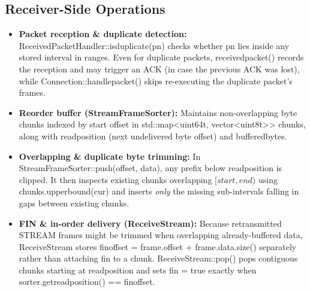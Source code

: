 \documentclass[10pt,a4paper]{article}
\newcommand{\codeul}{\textunderscore\hspace{0pt}}
\DeclareRobustCommand{\code}[1]{{\ttfamily\let\_\codeul #1}}
\begin{document}
\subsection{Receiver-Side Operations}
\begin{itemize}
    \item \textbf{Packet reception \& duplicate detection:} \code{ReceivedPacketHandler::is\_duplicate(pn)} checks whether \code{pn} lies inside any stored interval in \code{ranges}. Even for duplicate packets, \code{received\_packet()} records the reception and may trigger an ACK (in case the previous ACK was lost), while \code{Connection::handle\_packet()} skips re-executing the duplicate packet's frames.
    \item \textbf{Reorder buffer (\code{StreamFrameSorter}):} Maintains non-overlapping byte chunks indexed by start offset in \code{std::map<uint64\_t, vector<uint8\_t>> chunks}, along with \code{read\_position} (next undelivered byte offset) and \code{buffered\_bytes}.
    \item \textbf{Overlapping \& duplicate byte trimming:} In \code{StreamFrameSorter::push(offset, data)}, any prefix below \code{read\_position} is clipped. It then inspects existing chunks overlapping $[start, end)$ using \code{chunks.upper\_bound(cur)} and inserts \emph{only} the missing sub-intervals falling in gaps between existing chunks.
    \item \textbf{FIN \& in-order delivery (\code{ReceiveStream}):} Because retransmitted \code{STREAM} frames might be trimmed when overlapping already-buffered data, \code{ReceiveStream} stores \code{fin\_offset = frame.offset + frame.data.size()} separately rather than attaching \code{fin} to a chunk. \code{ReceiveStream::pop()} pops contiguous chunks starting at \code{read\_position} and sets \code{fin = true} exactly when \code{sorter.get\_read\_position() == fin\_offset}.
\end{itemize}
\end{document}
